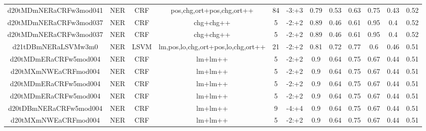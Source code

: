 \documentclass[a4paper]{article}
\begin{document}
\begin{landscape}
\begin{center}
\begin{tabular}{ |c|c|c|c|c|c|c|c|c|c|c|c|}
 
 	
 	\small{ d20tMDmNERaCRFw3mod041 } & \small{ NER} & \small{  CRF }  & pos,chg,ort+pos,chg,ort++  &  84 &  \small{  -3:+3 }  &  0.79 & 0.53 & 0.63  &  0.75 & 0.43 & 0.52 \\
 	

 
 	
 	\small{ d20tMDmNERaCRFw3mod037 } & \small{ NER} & \small{  CRF }  & chg+chg++  &  5 &  \small{  -2:+2 }  &  0.89 & 0.46 & 0.61  &  0.95 & 0.4 & 0.52 \\
 	

 
 	
 	\small{ d20tMDmNERaCRFw3mod037 } & \small{ NER} & \small{  CRF }  & chg+chg++  &  5 &  \small{  -2:+2 }  &  0.89 & 0.46 & 0.61  &  0.95 & 0.4 & 0.52 \\
 	

 
 	
 	\small{ d21tDBmNERaLSVMw3m0 } & \small{ NER} & \small{  LSVM }  & lm,pos,lo,chg,ort+pos,lo,chg,ort++  &  21 &  \small{  -2:+2 }  &  0.81 & 0.72 & 0.77  &  0.6 & 0.46 & 0.51 \\
 	

 
 	
 	\small{ d20tMDmERaCRFw5mod004 } & \small{ NER} & \small{  CRF }  & lm+lm++  &  5 &  \small{  -2:+2 }  &  0.9 & 0.64 & 0.75  &  0.67 & 0.44 & 0.51 \\
 	

 
 	
 	\small{ d20tMXmNWEaCRFmod004 } & \small{ NER} & \small{  CRF }  & lm+lm++  &  5 &  \small{  -2:+2 }  &  0.9 & 0.64 & 0.75  &  0.67 & 0.44 & 0.51 \\
 	

 
 	
 	\small{ d20tMDmERaCRFw5mod004 } & \small{ NER} & \small{  CRF }  & lm+lm++  &  5 &  \small{  -2:+2 }  &  0.9 & 0.64 & 0.75  &  0.67 & 0.44 & 0.51 \\
 	

 
 	
 	\small{ d20tMDmERaCRFw5mod004 } & \small{ NER} & \small{  CRF }  & lm+lm++  &  5 &  \small{  -2:+2 }  &  0.9 & 0.64 & 0.75  &  0.67 & 0.44 & 0.51 \\
 	

 
 	
 	\small{ d20tDBmNERaCRFw5mod004 } & \small{ NER} & \small{  CRF }  & lm+lm++  &  9 &  \small{  -4:+4 }  &  0.9 & 0.64 & 0.75  &  0.67 & 0.44 & 0.51 \\
 	

 
 	
 	\small{ d20tMXmNWEaCRFmod004 } & \small{ NER} & \small{  CRF }  & lm+lm++  &  5 &  \small{  -2:+2 }  &  0.9 & 0.64 & 0.75  &  0.67 & 0.44 & 0.51 \\
 	


\end{tabular}
\end{center}
\end{landscape}
\end{document}
